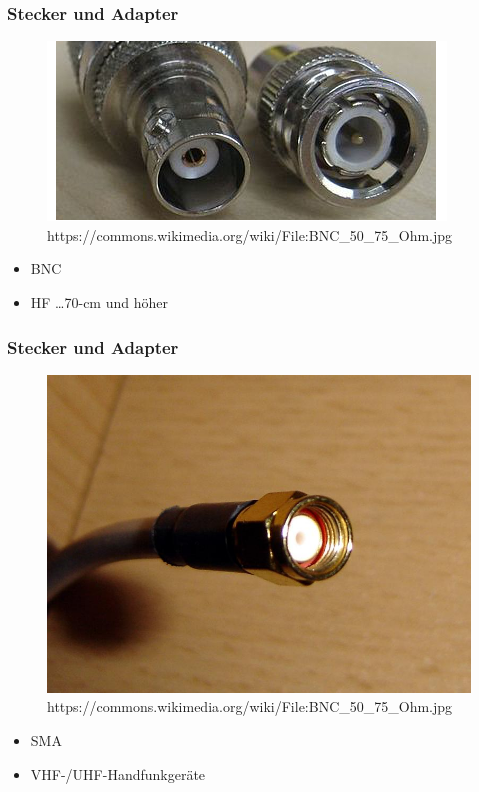 \begin{frame}
\frametitle{Stecker und Adapter}
\begin{center}
  \begin{figure}
	\includegraphics[width=.6\textwidth,height=.7\textheight,keepaspectratio]{e10/bnc.jpg}
                    {https://commons.wikimedia.org/wiki/File:BNC_50_75_Ohm.jpg}{\ccbysa}
      \end{figure}
	\begin{itemize}
		\item BNC
		\item HF \dots 70-cm und höher
	\end{itemize}	

\end{center}
\end{frame}

\begin{frame}
\frametitle{Stecker und Adapter}
\begin{center}
  \begin{figure}
	\includegraphics[width=.6\textwidth,height=.6\textheight,keepaspectratio]{e10/sma.jpg}
                    {https://commons.wikimedia.org/wiki/File:BNC_50_75_Ohm.jpg}{\ccpd}
      \end{figure}
	\begin{itemize}
		\item SMA
		\item VHF-/UHF-Handfunkgeräte
	\end{itemize}	 
\end{center}
\end{frame}

